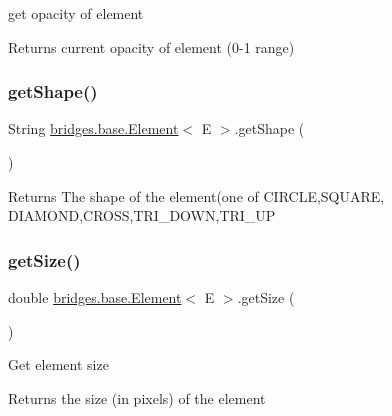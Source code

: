 get opacity of element

\begin{DoxyReturn}{Returns}
current opacity of element (0-\/1 range) 
\end{DoxyReturn}
\mbox{\label{classbridges_1_1base_1_1_element_aa0fe02d2f5491cf21cc6741f592536a8}} 
\subsubsection{\texorpdfstring{getShape()}{getShape()}}
{\footnotesize\ttfamily String \mbox{\hyperlink{classbridges_1_1base_1_1_element}{bridges.\+base.\+Element}}$<$ E $>$.get\+Shape (\begin{DoxyParamCaption}{ }\end{DoxyParamCaption})}

\begin{DoxyReturn}{Returns}
The shape of the element(one of C\+I\+R\+C\+LE,S\+Q\+U\+A\+RE, D\+I\+A\+M\+O\+ND,C\+R\+O\+SS,T\+R\+I\+\_\+\+D\+O\+WN,T\+R\+I\+\_\+\+UP 
\end{DoxyReturn}
\mbox{\label{classbridges_1_1base_1_1_element_add4b836e041e45e0c7a80eb7fd5a229d}} 
\subsubsection{\texorpdfstring{getSize()}{getSize()}}
{\footnotesize\ttfamily double \mbox{\hyperlink{classbridges_1_1base_1_1_element}{bridges.\+base.\+Element}}$<$ E $>$.get\+Size (\begin{DoxyParamCaption}{ }\end{DoxyParamCaption})}

Get element size \begin{DoxyReturn}{Returns}
the size (in pixels) of the element 
\end{DoxyReturn}
\mbox{\label{classbridges_1_1base_1_1_element_a44ddc61db34b6cf0bab7dfba667d54af}} 

